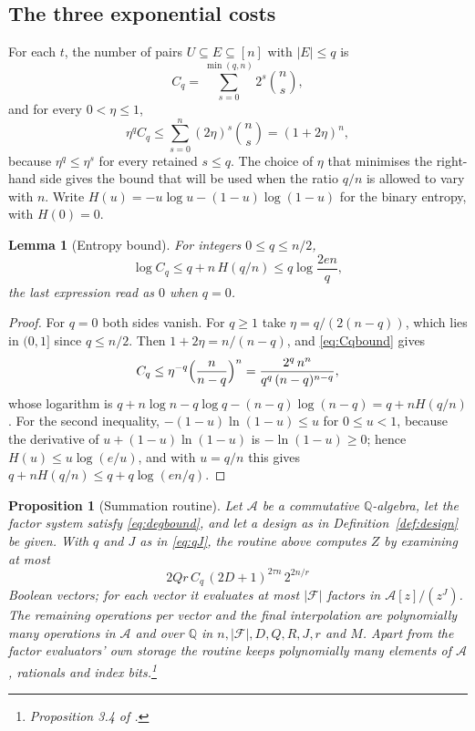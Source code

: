 \documentclass[11pt,reqno]{amsart}
\numberwithin{equation}{section}
\theoremstyle{plain}
\newtheorem{lemma}[theorem]{Lemma}
\newtheorem{proposition}[theorem]{Proposition}
\theoremstyle{definition}
\theoremstyle{remark}
\newcommand{\A}{\mathcal{A}}
\newcommand{\F}{\mathcal{F}}
\newcommand{\Q}{\mathbb{Q}}
\begin{document}
\subsection{The three exponential costs}
For each $t$, the number of pairs $U\subseteq E\subseteq[n]$ with $|E|\le q$ is
\begin{equation}\label{eq:Cq}
  C_q=\sum_{s=0}^{\min(q,n)}2^{s}\binom{n}{s},
\end{equation}
and for every $0<\eta\le1$,
\begin{equation}\label{eq:Cqbound}
  \eta^{q}C_q\le\sum_{s=0}^{n}(2\eta)^s\binom ns=(1+2\eta)^n ,
\end{equation}
because $\eta^q\le\eta^s$ for every retained $s\le q$. The choice of $\eta$
that minimises the right-hand side gives the bound that will be used when the
ratio $q/n$ is allowed to vary with $n$. Write
$H(u)=-u\log u-(1-u)\log(1-u)$ for the binary entropy, with $H(0)=0$.

\begin{lemma}[Entropy bound]\label{lem:entropy}
For integers $0\le q\le n/2$,
\begin{equation}\label{eq:Cqentropy}
  \log C_q\le q+n\,H(q/n)\le q\log\frac{2en}{q},
\end{equation}
the last expression read as $0$ when $q=0$.
\end{lemma}

\begin{proof}
For $q=0$ both sides vanish. For $q\ge1$ take $\eta=q/(2(n-q))$, which lies in
$(0,1]$ since $q\le n/2$. Then $1+2\eta=n/(n-q)$, and \eqref{eq:Cqbound} gives
\[
  C_q\le\eta^{-q}\Bigl(\frac{n}{n-q}\Bigr)^{n}
  =\frac{2^q\,n^n}{q^q\,(n-q)^{n-q}} ,
\]
whose logarithm is $q+n\log n-q\log q-(n-q)\log(n-q)=q+nH(q/n)$. For the second
inequality, $-(1-u)\ln(1-u)\le u$ for $0\le u<1$, because the derivative of
$u+(1-u)\ln(1-u)$ is $-\ln(1-u)\ge0$; hence $H(u)\le u\log(e/u)$, and with $u=q/n$
this gives $q+nH(q/n)\le q+q\log(en/q)$.
\end{proof}

\begin{proposition}[Summation routine]\label{prop:routine}
Let $\A$ be a commutative $\Q$-algebra, let the factor system satisfy
\eqref{eq:degbound}, and let a design as in Definition~\ref{def:design} be given.
With $q$ and $J$ as in \eqref{eq:qJ}, the routine above computes $Z$ by examining
at most
\begin{equation}\label{eq:routinecost}
  2Qr\,C_q\,(2D+1)^{2\tau n}\,2^{2n/r}
\end{equation}
Boolean vectors; for each vector it evaluates at most $|\F|$ factors in
$\A[z]/(z^J)$. The remaining operations per vector and the final interpolation
are polynomially many operations in $\A$ and over $\Q$ in $n,|\F|,D,Q,R,J,r$ and
$M$. Apart from the factor evaluators' own storage the routine keeps polynomially
many elements of $\A$, rationals and index bits.\footnote{Proposition 3.4 of
\cite{OAI26}.}
\end{proposition}
\end{document}
